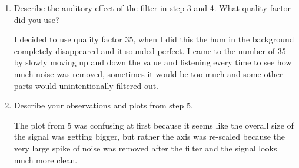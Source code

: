 \documentclass{article}
\begin{document}
\begin{enumerate}
\begin{enumerate}
        \item Describe the auditory effect of the filter in step 3 and 4. What quality factor did you use?
        \begin{center}
            I decided to use quality factor 35, when I did this the hum in the background completely disappeared and it sounded perfect. I came to the number of 35 by slowly moving up and down the value and listening every time to see how much noise was removed, sometimes it would be too much and some other parts would unintentionally filtered out.
        \end{center}
        \item Describe your observations and plots from step 5.
        \begin{center}
            The plot from 5 was confusing at first because it seems like the overall size of the signal was getting bigger, but rather the axis was re-scaled because the very large spike of noise was removed after the filter and the signal looks much more clean.
        \end{center}
    \end{enumerate}
\end{enumerate}
\newpage
\end{document}

